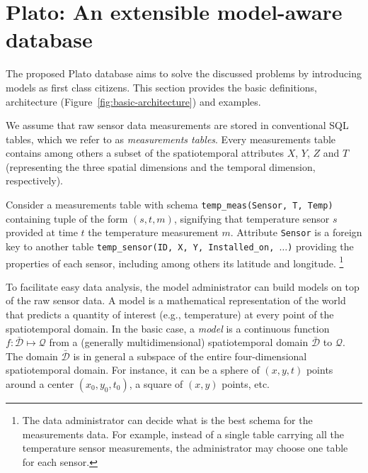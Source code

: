 
\section{Plato: An extensible model-aware database}
\label{sec:architecture}
The proposed Plato database aims to solve the discussed problems by introducing models as first class citizens. This section provides the basic definitions, architecture (Figure~\ref{fig:basic-architecture}) and examples.

We assume that raw sensor data measurements are stored in conventional SQL tables, which we refer to as {\em measurements tables}. Every measurements table contains among others a subset of the spatiotemporal attributes $X$, $Y$, $Z$ and $T$ (representing the three spatial dimensions and the temporal dimension, respectively).

\vspace*{0.5cm}
\begin{example}
Consider a measurements table with schema \texttt{temp\_meas(Sensor, T, Temp)} containing tuple of the form $(s, t, m)$, signifying that temperature sensor $s$ provided at time $t$ the temperature measurement $m$.
Attribute \texttt{Sensor} is a foreign key to another table \texttt{temp\_sensor(ID, X, Y, Installed\_on, $\ldots$)} providing the properties of each sensor, including among others its latitude and longitude.%
\footnote{The data administrator can decide what is the best schema for the measurements data. For example, instead of a single table carrying all the temperature sensor measurements, the administrator may choose one table for each sensor.
}
\end{example}
\vspace*{0.5cm}

To facilitate easy data analysis, the model administrator can build models on top of the raw sensor data. A model is a mathematical representation of the world that predicts a quantity of interest (e.g., temperature) at every point of the spatiotemporal domain.
In the basic case, a {\em model} is a continuous function $f:\mathcal{\bar{D}}\mapsto \mathcal{Q}$ from a (generally multidimensional) spatiotemporal domain $\mathcal{\bar{D}}$ to $\mathcal{Q}$. The domain $\mathcal{\bar{D}}$ is in general a subspace of the entire four-dimensional spatiotemporal domain. For instance, it can be a sphere of $(x, y, t)$ points around a center $(x_0, y_0, t_0)$, a square of $(x, y)$ points, etc.

